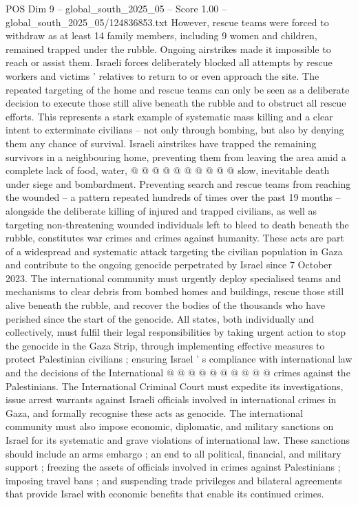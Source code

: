 \begin{textsample}{POS Dim 9 – global\_south\_2025\_05 – Score 1.00 – global\_south\_2025\_05/124836853.txt}
However, rescue teams were forced to withdraw as at least 14 family members, including 9 women and children, remained trapped under the rubble.
Ongoing airstrikes made it impossible to reach or assist them.
Israeli forces deliberately blocked all attempts by rescue workers and victims ' relatives to return to or even approach the site.
The repeated targeting of the home and rescue teams can only be seen as a deliberate decision to execute those still alive beneath the rubble and to obstruct all rescue efforts.
This represents a stark example of systematic mass killing and a clear intent to exterminate civilians -- not only through bombing, but also by denying them any chance of survival.
Israeli airstrikes have trapped the remaining survivors in a neighbouring home, preventing them from leaving the area amid a complete lack of food, water, @ @ @ @ @ @ @ @ @ @ slow, inevitable death under siege and bombardment.
Preventing search and rescue teams from reaching the wounded -- a pattern repeated hundreds of times over the past 19 months -- alongside the deliberate killing of injured and trapped civilians, as well as targeting non-threatening wounded individuals left to bleed to death beneath the rubble, constitutes war crimes and crimes against humanity.
These acts are part of a widespread and systematic attack targeting the civilian population in Gaza and contribute to the ongoing genocide perpetrated by Israel since 7 October 2023.
The international community must urgently deploy specialised teams and mechanisms to clear debris from bombed homes and buildings, rescue those still alive beneath the rubble, and recover the bodies of the thousands who have perished since the start of the genocide.
All states, both individually and collectively, must fulfil their legal responsibilities by taking urgent action to stop the genocide in the Gaza Strip, through implementing effective measures to protect Palestinian civilians ; ensuring Israel ' s compliance with international law and the decisions of the International @ @ @ @ @ @ @ @ @ @ crimes against the Palestinians.
The International Criminal Court must expedite its investigations, issue arrest warrants against Israeli officials involved in international crimes in Gaza, and formally recognise these acts as genocide.
The international community must also impose economic, diplomatic, and military sanctions on Israel for its systematic and grave violations of international law.
These sanctions should include an arms embargo ; an end to all political, financial, and military support ; freezing the assets of officials involved in crimes against Palestinians ; imposing travel bans ; and suspending trade privileges and bilateral agreements that provide Israel with economic benefits that enable its continued crimes.

\end{textsample}
